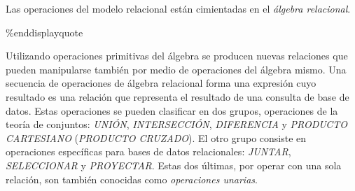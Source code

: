 Las operaciones del modelo relacional están cimientadas en el \emph{álgebra relacional}.

\%end{displayquote}

Utilizando operaciones primitivas del álgebra se producen nuevas relaciones que pueden manipularse también por medio de operaciones del álgebra mismo. Una secuencia de operaciones de álgebra relacional forma una expresión cuyo resultado es una relación que representa el resultado de una consulta de base de datos. Estas operaciones se pueden clasificar en dos grupos, operaciones de la teoría de conjuntos: \emph{UNIÓN}, \emph{INTERSECCIÓN}, \emph{DIFERENCIA} y \emph{PRODUCTO CARTESIANO} (\emph{PRODUCTO CRUZADO}). El otro grupo consiste en operaciones específicas para bases de datos relacionales: \emph{JUNTAR}, \emph{SELECCIONAR} y \emph{PROYECTAR}. Estas dos últimas, por operar con una sola relación, son también conocidas como \emph{operaciones unarias}.

